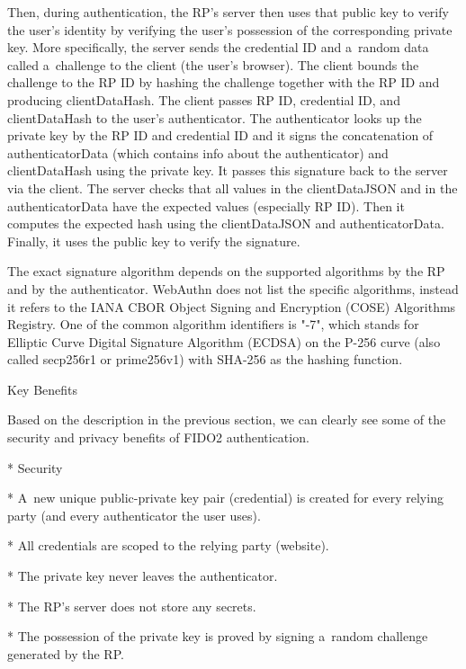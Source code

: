 Then, during {\sbf authentication}, the RP's server then uses that {\sbf public key} to verify the user's identity by verifying the user's possession of the corresponding private key. More specifically, the server sends the credential ID and a~random data called a~challenge to the client (the user's browser). The client bounds the challenge to the RP ID by hashing the challenge together with the RP ID and producing clientDataHash. The client passes RP ID, credential ID, and clientDataHash to the user's authenticator. The authenticator looks up the {\sbf private key} by the RP ID and credential ID and it signs the concatenation of authenticatorData (which contains info about the authenticator) and clientDataHash using the {\sbf private key}. It passes this signature back to the server via the client. The server checks that all values in the clientDataJSON and in the authenticatorData have the expected values (especially RP ID). Then it computes the expected hash using the clientDataJSON and authenticatorData. Finally, it uses the {\sbf public key} to verify the signature.

The exact signature algorithm depends on the supported algorithms by the RP and by the authenticator. WebAuthn does not list the specific algorithms, instead it refers to the IANA CBOR Object Signing and Encryption (COSE) Algorithms Registry. One of the common algorithm identifiers is "-7", which stands for Elliptic Curve Digital Signature Algorithm (ECDSA) on the P-256 curve (also called secp256r1 or prime256v1) with SHA-256 as the hashing function.


\sec Key Benefits

Based on the description in the previous section, we can clearly see some of the security and privacy benefits of FIDO2 authentication.

\begitems

* {\sbf Security}

\begitems

* A~new unique public-private key pair (credential) is created for every relying party (and every authenticator the user uses).

* All credentials are scoped to the relying party (website).

* The private key never leaves the authenticator.

* The RP's server does not store any secrets.

* The possession of the private key is proved by signing a~random challenge generated by the RP.


